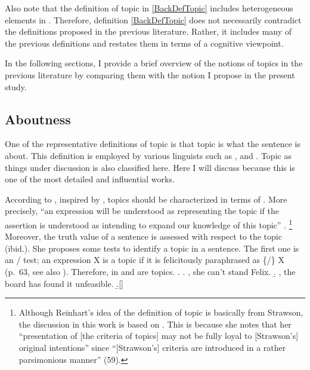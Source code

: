 Also note that the definition of topic in \ref{BackDefTopic} includes heterogeneous elements in \Last.
Therefore, definition \ref{BackDefTopic} does not necessarily contradict the definitions proposed in the previous literature.
Rather, it includes many of the previous definitions and restates them in terms of a cognitive viewpoint.

In the following sections, I provide a brief overview of the notions of topics in the previous literature by comparing them with the notion I propose in the present study.

\subsection{Aboutness}

One of the representative definitions of topic is that
topic is what the sentence is about.
This definition is employed by various linguists such as , and .
Topic as things under discussion \cite[e.g.,][]{heycock08} is also classified here.
Here I will discuss  because this is one of the most detailed and influential works.

According to ,
inspired by ,
topics should be characterized in terms of .
More precisely,
``an expression will be understood as representing the topic
if the assertion is understood as intending to expand our knowledge of this topic'' \cite[59]{reinhart81}.%
  \footnote{
  Although Reinhart's idea of the definition of topic is basically from Strawson,
  the discussion in this work is based on .
  This is because she notes that her ``presentation of [the criteria of topics] may not be fully loyal to [Strawson's] original intentions'' since ``[Strawson's] criteria are introduced in a rather parsimonious manner'' (59).
  }
Moreover, the truth value of a sentence is assessed with respect to the topic ({ibid.}).
She proposes some tests to identify a topic in a sentence.
The first one is an / test;
an expression X is a topic if it is felicitously paraphrased as \{/\} X (p.~63, see also ).
Therefore,  in \Next[a] and  \Next[b] are topics.
%
\ex. \a. , she can't stand Felix.
     \b. , the board has found it unfeasible.
     \b.[] \hfill{\cite[59]{reinhart81}}

